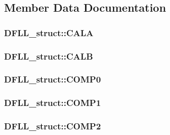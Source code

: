 \subsection{Member Data Documentation}
\hypertarget{struct_d_f_l_l__struct_ae3b0088249723a12f6b94f12f27da2bf}{
\subsubsection[{CALA}]{ {\bf DFLL\_\-struct::CALA}}}
\label{struct_d_f_l_l__struct_ae3b0088249723a12f6b94f12f27da2bf}
\hypertarget{struct_d_f_l_l__struct_a3b301c9e72d1a898cf43de28c05c4924}{
\subsubsection[{CALB}]{ {\bf DFLL\_\-struct::CALB}}}
\label{struct_d_f_l_l__struct_a3b301c9e72d1a898cf43de28c05c4924}
\hypertarget{struct_d_f_l_l__struct_a204664b2ce7db1102501ac95ef627c20}{
\subsubsection[{COMP0}]{ {\bf DFLL\_\-struct::COMP0}}}
\label{struct_d_f_l_l__struct_a204664b2ce7db1102501ac95ef627c20}
\hypertarget{struct_d_f_l_l__struct_a36cead723e87ed911a4694174cbdaf8d}{
\subsubsection[{COMP1}]{ {\bf DFLL\_\-struct::COMP1}}}
\label{struct_d_f_l_l__struct_a36cead723e87ed911a4694174cbdaf8d}
\hypertarget{struct_d_f_l_l__struct_adca6783bcb9f4ffeb729efba3a6b0213}{
\subsubsection[{COMP2}]{ {\bf DFLL\_\-struct::COMP2}}}
